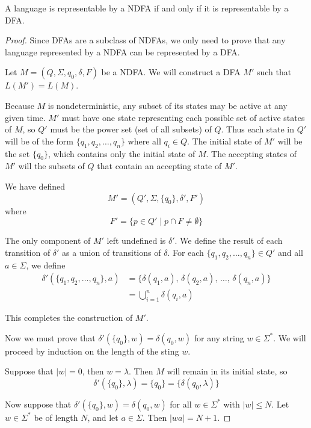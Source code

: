 \documentclass{bcthesis}
\begin{document}
	\begin{claim}
	\label{prop:ndfa_dfa_equivalent}
		A language is representable by a NDFA if and only if it is representable by a DFA.
	\end{claim}
	\begin{proof}
	\label{proof:ndfa_dfa_equivalent}
		Since DFAs are a subclass of NDFAs, we only need to prove that any language represented by a NDFA can be represented by a DFA.

		Let $M = (Q, \Sigma, q_0, \delta, F)$ be a NDFA.
		We will construct a DFA $M'$ such that $L(M') = L(M)$.

		Because $M$ is nondeterministic, any subset of its states may be active at any given time.
		$M'$ must have one state representing each possible set of active states of $M$, so $Q'$ must be the power set (set of all subsets) of $Q$.
		Thus each state in $Q'$ will be of the form $\{ q_1, q_2, \dots, q_n \}$ where all $q_i \in Q$.
		The initial state of $M'$ will be the set $\{ q_0 \}$, which contains only the initial state of $M$.
		The accepting states of $M'$ will the subsets of $Q$ that contain an accepting state of $M'$.

		We have defined
		\[
			M' = (Q', \Sigma, \{q_0\}, \delta', F')
		\]
		where
		\[
			F' = \{ p \in Q' \mid p \cap F \neq \emptyset\}
		\]

		The only component of $M'$ left undefined is $\delta'$.
		We define the result of each transition of $\delta'$ as a union of transitions of $\delta$.
		For each $\{ q_1, q_2, \dots, q_n \} \in Q'$ and all $a \in \Sigma$, we define
		\begin{align*}
			\delta'(\{ q_1, q_2, \dots, q_n \}, a) &= \{ \delta(q_1, a),\, \delta(q_2, a),\, \dots,\, \delta(q_n, a) \} \\
			&= \bigcup_{i=1}^n \delta(q_i, a)
		\end{align*}
		
		This completes the construction of $M'$.

		Now we must prove that $\delta'(\{ q_0 \}, w) = \delta(q_0, w)$ for any string $w \in \Sigma^*$.
		We will proceed by induction on the length of the sting $w$.

		Suppose that $|w| = 0$, then $w = \lambda$.
		Then $M$ will remain in its initial state, so 
		\[
			\delta'(\{ q_0 \}, \lambda) = \{ q_0 \} = \{ \delta(q_0, \lambda) \}
		\]

		Now suppose that $\delta'(\{ q_0 \}, w) = \delta(q_0, w)$ for all $w \in \Sigma^*$ with $|w| \leq N$.
		Let $w \in \Sigma^*$ be of length $N$, and let $a \in \Sigma$. 
		Then $|wa| = N + 1$.
		

\end{proof}
\end{document}
